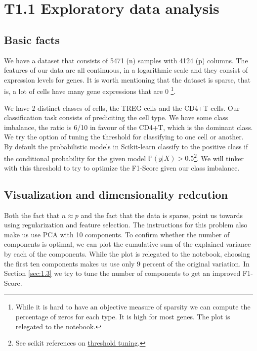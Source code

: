 \documentclass{article}
\begin{document}
\graphicspath{ {Figures/} }

\section*{T1.1 Exploratory data analysis}



\subsection*{Basic facts}
We have a dataset that consists of 5471 (n) samples with 4124 (p) columns. The features of our data are all continuous, in a logarithmic scale and they consist of expression levels 
for genes. It is worth mentioning that the dataset is sparse, that is, a lot of cells have many gene expressions that are 0 
\footnote{While it is hard to have an objective measure of sparsity we can compute the percentage of zeros for each type. It is high for most genes. The plot is relegated to the notebook.}.



We have 2 distinct classes of cells, the TREG cells and the CD4+T cells. 
Our classification task consists of prediciting the cell type. We have some class imbalance, the ratio is 6/10 in favour of the CD4+T, 
which is the dominant class. We try the option of tuning the threshold for classifying to one cell or another. By default the probabilistic models in Scikit-learn
classify to the positive class if the conditional probability for the given model $\mathbb{P}(\textit{y}|X) > 0.5$\footnote{See scikit references on \href{https://scikit-learn.org/1.5/modules/classification_threshold.html}{threshold tuning}.}. 
We will tinker with this threshold to try to optimize the F1-Score given our class imbalance.  

\subsection*{Visualization and dimensionality redcution}

Both the fact that $n \approx p$ and the fact that the data is sparse, point us towards using regularization and feature selection.
The instructions for this problem also make us use PCA with 10 components. To confirm whether the number of components is optimal, we can plot the cumulative sum of the explained variance by each of the components.
While the plot is relegated to the notebook, choosing the first ten components makes us use only 9 percent of the original variation.
In Section \ref{sec:1.3} we try to tune the number of components to get an improved F1-Score.
\end{document}
